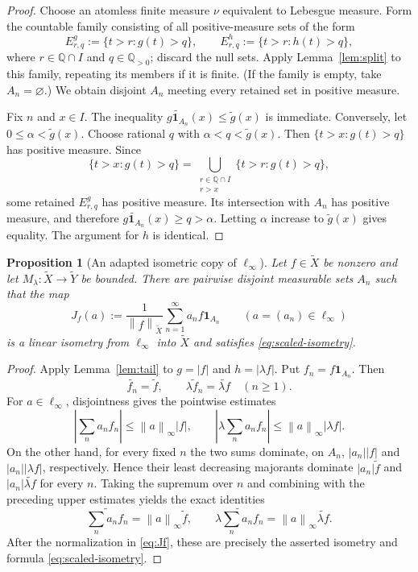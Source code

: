 \documentclass[11pt]{article}
\newtheorem{proposition}[theorem]{Proposition}
\theoremstyle{remark}
\newcommand{\tX}{\widetilde X}
\newcommand{\tY}{\widetilde Y}
\newcommand{\norm}[1]{\left\lVert #1\right\rVert}
\newcommand{\one}{\mathbf 1}
\begin{document}
\begin{proof}
Choose an atomless finite measure $\nu$ equivalent to Lebesgue measure.  Form
the countable family consisting of all positive-measure sets of the form
\[
 E^g_{r,q}:=\{t>r:g(t)>q\},\qquad
 E^h_{r,q}:=\{t>r:h(t)>q\},
\]
where $r\in\mathbb Q\cap I$ and $q\in\mathbb Q_{>0}$; discard the null sets.
Apply Lemma~\ref{lem:split} to this family, repeating its members if it is
finite.  (If the family is empty, take $A_n=\varnothing$.)  We obtain
disjoint $A_n$ meeting every retained set in positive measure.

Fix $n$ and $x\in I$.  The inequality
$\widetilde{g\one_{A_n}}(x)\leq\widetilde g(x)$ is immediate.  Conversely,
let $0\leq\alpha<\widetilde g(x)$.  Choose rational $q$ with
$\alpha<q<\widetilde g(x)$.  Then
$\{t>x:g(t)>q\}$ has positive measure.  Since
\[
 \{t>x:g(t)>q\}
 =\bigcup_{\substack{r\in\mathbb Q\cap I\\r>x}}
   \{t>r:g(t)>q\},
\]
some retained $E^g_{r,q}$ has positive measure.  Its intersection with
$A_n$ has positive measure, and therefore
$\widetilde{g\one_{A_n}}(x)\geq q>\alpha$.  Letting $\alpha$ increase to
$\widetilde g(x)$ gives equality.  The argument for $h$ is identical.
\end{proof}

\begin{proposition}[An adapted isometric copy of $\ell_\infty$]
\label{prop:adapted}
Let $f\in\tX$ be nonzero and let $M_\lambda:\tX\to\tY$ be bounded.  There are
pairwise disjoint measurable sets $A_n$ such that the map
\begin{equation}\label{eq:Jf}
 J_f(a):=\frac1{\norm{f}_{\tX}}
          \sum_{n=1}^\infty a_n f\one_{A_n}
 \qquad(a=(a_n)\in\ell_\infty)
\end{equation}
is a linear isometry from $\ell_\infty$ into $\tX$ and satisfies
\eqref{eq:scaled-isometry}.
\end{proposition}

\begin{proof}
Apply Lemma~\ref{lem:tail} to $g=|f|$ and $h=|\lambda f|$.  Put
$f_n=f\one_{A_n}$.  Then
\[
 \widetilde{f_n}=\widetilde f,
 \qquad
 \widetilde{\lambda f_n}=\widetilde{\lambda f}
 \quad(n\geq1).
\]
For $a\in\ell_\infty$, disjointness gives the pointwise estimates
\[
 \left|\sum_n a_nf_n\right|\leq\norm{a}_\infty|f|,
 \qquad
 \left|\lambda\sum_n a_nf_n\right|
       \leq\norm{a}_\infty|\lambda f|.
\]
On the other hand, for every fixed $n$ the two sums dominate, on $A_n$,
$|a_n||f|$ and $|a_n||\lambda f|$, respectively.  Hence their least
decreasing majorants dominate $|a_n|\widetilde f$ and
$|a_n|\widetilde{\lambda f}$ for every $n$.  Taking the supremum over $n$
and combining with the preceding upper estimates yields the exact identities
\[
 \widetilde{\sum_n a_nf_n}=\norm{a}_\infty\widetilde f,
 \qquad
 \widetilde{\lambda\sum_n a_nf_n}
       =\norm{a}_\infty\widetilde{\lambda f}.
\]
After the normalization in \eqref{eq:Jf}, these are precisely the asserted
isometry and formula \eqref{eq:scaled-isometry}.
\end{proof}
\end{document}
